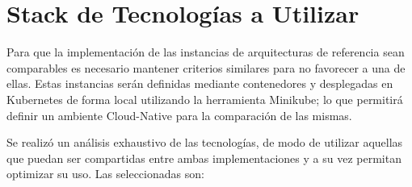 \section{Stack de Tecnologías a Utilizar}

Para que la implementación de las instancias de arquitecturas de referencia sean comparables es necesario mantener criterios similares para no favorecer a una de ellas.
Estas instancias serán definidas mediante contenedores y desplegadas en Kubernetes de forma local utilizando la herramienta Minikube; 
lo que permitirá definir un ambiente Cloud-Native para la comparación de las mismas.

Se realizó un análisis exhaustivo de las tecnologías, de modo de utilizar aquellas que puedan ser compartidas entre ambas implementaciones y a su vez permitan
optimizar su uso. Las seleccionadas son: 


